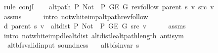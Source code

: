 \begin{isabellebody}
\isamarkupfalse%
\ {\isacharparenleft}{\kern0pt}rule\ conjI{\isacharparenright}{\kern0pt}\isanewline
\ \ \isamarkupfalse%
\ {\isachardoublequoteopen}alt{\isacharunderscore}{\kern0pt}path\ P{\isacharprime}{\kern0pt}{\isacharprime}{\kern0pt}\ {\isacharparenleft}{\kern0pt}Not\ {\isasymcirc}\ P{\isacharprime}{\kern0pt}{\isacharprime}{\kern0pt}{\isacharparenright}{\kern0pt}\ {\isacharparenleft}{\kern0pt}G{\isachardot}{\kern0pt}E\ G{\isacharparenright}{\kern0pt}\ {\isacharparenleft}{\kern0pt}rev{\isacharunderscore}{\kern0pt}follow\ {\isacharparenleft}{\kern0pt}parent\ s{\isacharparenright}{\kern0pt}\ v{\isacharparenright}{\kern0pt}\ src\ v{\isachardoublequoteclose}\isanewline
\ \ \ \ \isamarkupfalse%
\ assms\isanewline
\ \ \ \ \isamarkupfalse%
\ {\isacharparenleft}{\kern0pt}intro\ not{\isacharunderscore}{\kern0pt}white{\isacharunderscore}{\kern0pt}imp{\isacharunderscore}{\kern0pt}alt{\isacharunderscore}{\kern0pt}path{\isacharunderscore}{\kern0pt}rev{\isacharunderscore}{\kern0pt}follow{\isacharparenright}{\kern0pt}\isanewline
\ \ \isamarkupfalse%
\ {\isachardoublequoteopen}d\ {\isacharparenleft}{\kern0pt}parent\ s{\isacharparenright}{\kern0pt}\ v\ {\isacharequal}{\kern0pt}\ alt{\isacharunderscore}{\kern0pt}dist\ P{\isacharprime}{\kern0pt}{\isacharprime}{\kern0pt}\ {\isacharparenleft}{\kern0pt}Not\ {\isasymcirc}\ P{\isacharprime}{\kern0pt}{\isacharprime}{\kern0pt}{\isacharparenright}{\kern0pt}\ {\isacharparenleft}{\kern0pt}G{\isachardot}{\kern0pt}E\ G{\isacharparenright}{\kern0pt}\ src\ v{\isachardoublequoteclose}\isanewline
\ \ \ \ \isamarkupfalse%
\ assms\isanewline
\ \ \ \ \isamarkupfalse%
\ {\isacharparenleft}{\kern0pt}intro\ not{\isacharunderscore}{\kern0pt}white{\isacharunderscore}{\kern0pt}imp{\isacharunderscore}{\kern0pt}d{\isacharunderscore}{\kern0pt}le{\isacharunderscore}{\kern0pt}alt{\isacharunderscore}{\kern0pt}dist\ alt{\isacharunderscore}{\kern0pt}dist{\isacharunderscore}{\kern0pt}le{\isacharunderscore}{\kern0pt}alt{\isacharunderscore}{\kern0pt}path{\isacharunderscore}{\kern0pt}length\ antisym{\isacharparenright}{\kern0pt}\isanewline
{}\isamarkupfalse%
%
\endisatagproof
{\isafoldproof}%
%
\isadelimproof
\isanewline
%
\endisadelimproof
\isanewline
{}\isamarkupfalse%
\ {\isacharparenleft}{\kern0pt}\ alt{\isacharunderscore}{\kern0pt}bfs{\isacharunderscore}{\kern0pt}valid{\isacharunderscore}{\kern0pt}input{\isacharparenright}{\kern0pt}\ soundness{\isacharcolon}{\kern0pt}\isanewline
\ \ \ {\isachardoublequoteopen}alt{\isacharunderscore}{\kern0pt}bfs{\isacharunderscore}{\kern0pt}invar{\isacharprime}{\kern0pt}{\isacharprime}{\kern0pt}\ s{\isachardoublequoteclose}\isanewline

\end{isabellebody}
